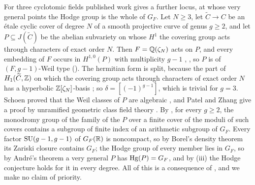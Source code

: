 \begin{remark}\label{rem:quarticprym}
For three cyclotomic fields published work gives a further locus, at whose
very general points the Hodge group is the whole of $G_{F}$. Let $N\ge3$,
let $\widetilde C\to C$ be an \'etale cyclic cover of degree $N$ of a smooth
projective curve of genus
$g\ge2$, and let $P\subseteq J(\widetilde C)$ be the abelian subvariety on
whose $H^{1}$ the covering group acts through characters of exact order $N$.
Then $F=\mathbb{Q}(\zeta_{N})$ acts on $P$, and every embedding of $F$ occurs in
$H^{1,0}(P)$ with multiplicity $g-1$ \cite[Lemma~1.6a]{Sch88},
\cite[Lemma~5.1]{PZ25}, so $P$ is of $(F,g-1)$-Weil type
(). The hermitian form is split, because the part of
$H_{1}(\widetilde C,\mathbb{Z})$ on which the covering group acts through
characters of exact order $N$ has a hyperbolic $\mathbb{Z}[\zeta_{N}]$-basis
\cite[Proposition~2.2]{Loo97}; so $\delta=[(-1)^{g-1}]$, which is trivial for
$g=3$. Schoen proved that the Weil classes of $P$ are algebraic
\cite[Theorem~2.0 with $r=0$, Corollary~3.1]{Sch88}, and Patel and Zhang give
a proof by unramified geometric class field theory
\cite[Theorems~1.1, 1.2 and~5.3, Remark~3.7]{PZ25}. By
\cite[Theorem~2.4]{Loo97}, for every $g\ge2$, the monodromy group of the
family of the $P$ over a finite cover of the moduli of such covers contains a
subgroup of finite index of an arithmetic subgroup of $G_{F}$. Every factor
$\operatorname{SU}(g-1,g-1)$ of $G_{F}(\mathbb{R})$ is noncompact, so by Borel's density theorem
\cite{Bor60} its Zariski closure contains $G_{F}$; the Hodge group of every
member lies in $G_{F}$, so by Andr\'e's theorem \cite[Theorem~1]{And92} a very
general $P$ has $\operatorname{Hg}(P)=G_{F}$, and by (iii) the Hodge
conjecture holds for it in every degree. All of this is a consequence of
\cite{Sch88,Loo97,And92}, and we make no claim of priority.


\end{remark}
